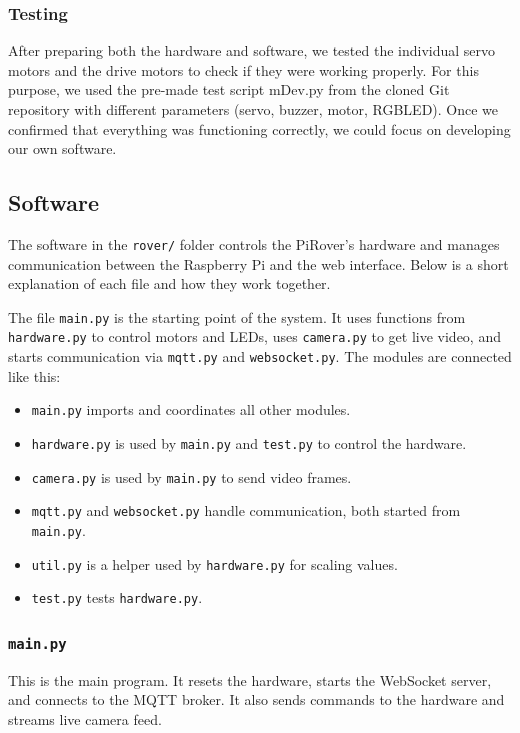     \subsubsection{Testing}
    After preparing both the hardware and software, we tested the individual servo motors and the drive motors to check if they were working properly.
    For this purpose, we used the pre-made test script mDev.py from the cloned Git repository with different parameters (servo, buzzer, motor, RGBLED). Once we confirmed that everything was functioning correctly, we could focus on developing our own software.

    \subsection{Software}
    The software in the \texttt{rover/} folder controls the PiRover's hardware and manages communication between the Raspberry Pi and the web interface. Below is a short explanation of each file and how they work together.

    The file \texttt{main.py} is the starting point of the system. It uses functions from \texttt{hardware.py} to control motors and LEDs, uses \texttt{camera.py} to get live video, and starts communication via \texttt{mqtt.py} and \texttt{websocket.py}.
    The modules are connected like this:
    \begin{itemize}[noitemsep, topsep=0pt]
        \item \texttt{main.py} imports and coordinates all other modules.
        \item \texttt{hardware.py} is used by \texttt{main.py} and \texttt{test.py} to control the hardware.
        \item \texttt{camera.py} is used by \texttt{main.py} to send video frames.
        \item \texttt{mqtt.py} and \texttt{websocket.py} handle communication, both started from \texttt{main.py}.
        \item \texttt{util.py} is a helper used by \texttt{hardware.py} for scaling values.
        \item \texttt{test.py} tests \texttt{hardware.py}.
    \end{itemize}

    \subsubsection*{\texttt{main.py}}
    This is the main program. It resets the hardware, starts the WebSocket server, and connects to the MQTT broker. It also sends commands to the hardware and streams live camera feed.

